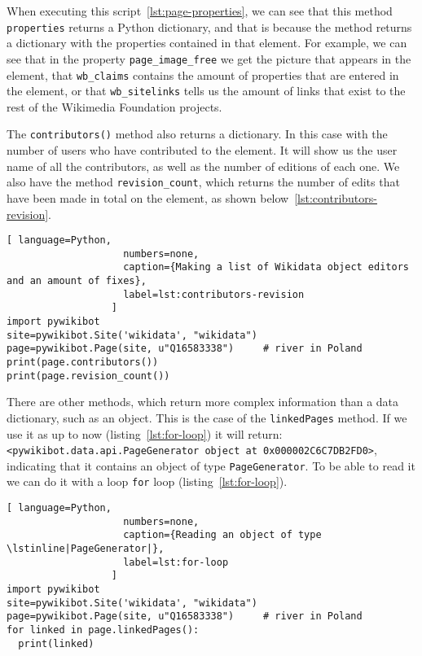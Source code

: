 When executing this script~\ref{lst:page-properties}, we can see that this method \lstinline|properties| 
returns a Python dictionary, and that is because the method returns a dictionary with the properties contained in that element. 
For example, we can see that in the property \lstinline|page_image_free| we get the picture that appears in the element, that
 \lstinline|wb_claims| contains the amount of properties that are entered in the element, 
or that \lstinline|wb_sitelinks| tells us the amount of links that exist to the rest of the Wikimedia Foundation projects.

The \lstinline|contributors()| method also returns a dictionary. In this case with the number of users who have contributed to the element. 
It will show us the user name of all the contributors, as well as the number of editions of each one.
We also have the method \lstinline|revision_count|, which returns the number of edits that have been made in total on the element, as shown below~\ref{lst:contributors-revision}.

\begin{lstlisting}[ language=Python,
                    numbers=none,
                    caption={Making a list of Wikidata object editors and an amount of fixes},
                    label=lst:contributors-revision
                  ]
import pywikibot
site=pywikibot.Site('wikidata', "wikidata")
page=pywikibot.Page(site, u"Q16583338")     # river in Poland
print(page.contributors())
print(page.revision_count())
\end{lstlisting}

There are other methods, which return more complex information than a data dictionary, such as an object.
This is the case of the \lstinline|linkedPages| method. If we use it as up to now (listing~\ref{lst:for-loop}) it will return: 
\lstinline|<pywikibot.data.api.PageGenerator object at 0x000002C6C7DB2FD0>|, indicating that it contains an object of type \lstinline|PageGenerator|. 
To be able to read it we can do it with a loop \lstinline|for| loop (listing~\ref{lst:for-loop}).

\begin{lstlisting}[ language=Python,
                    numbers=none,
                    caption={Reading an object of type \lstinline|PageGenerator|},
                    label=lst:for-loop
                  ]
import pywikibot
site=pywikibot.Site('wikidata', "wikidata")
page=pywikibot.Page(site, u"Q16583338")     # river in Poland
for linked in page.linkedPages():
  print(linked)
\end{lstlisting}

